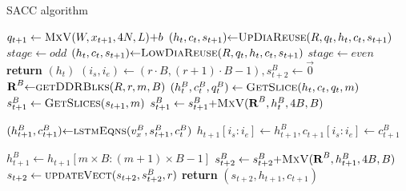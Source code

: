 \begin{algorithm}[H]
	\caption{SACC algorithm}
   \label{Algo:SACCAlgo}
	\begin{algorithmic}[1]
		 \label{alg:CompLSTMCell}
\State $q_{t+1}\gets \Call{MxV}{W,x_{t+1},4N,L}{+}b$\label{alg:Wx+b}
\State $(h_{t},c_{t},s_{t+1}){\gets}\Call{UpDiaReuse}{R,q_t,h_t,c_t,s_{t+1}}$\label{alg:callUpDiaReuse}
\State $stage\gets odd$
\Else
\State $(h_{t},c_{t},s_{t+1}){\gets}\Call{LowDiaReuse}{R,q_t,h_t,c_t,s_{t+1}}$\label{alg:callLowDiaReuse}
\State $stage\gets even$
\EndIf
\State \textbf{return} $(h_{t})$
\EndProcedure	
%
		 \label{alg:LowDiagReuse}
		 \label{alg:LowDiag_outFor} 
		\State $(i_s,i_e) \gets (r{\cdot}B,(r{+}1){\cdot}B{-}1), s^B_{t+2} \gets \vec{0}$
		 \label{alg:LowDiag_inFor}
		\State $\textbf{R}^B {\gets}\Call{getDDRBlks}{R,r,m,B}$	     \label{alg:LowDiag_GetDDRBlks}   		     
       \State $(h^B_t,c^B_t,q^B_t)\gets \Call{GetSlice}{h_t,c_t,q_t,m}$ \label{alg:LowDiag_GetSlice}
       \State $s^B_{t+1}\gets \Call{GetSlices}{s_{t+1},m}$ \label{alg:LowDiag_GetSlices}
		\State $s^B_{t+1}\gets s^B_{t+1}{+}\Call{MxV}{\textbf{R}^B,h^B_t,4B,B}$ \label{alg:LowDiag_ReuseR1}  
		
		 \label{alg:LowDiag_if}
		\State$(h^B_{t+1},c^B_{t+1}){\gets}\Call{lstmEqns}{v^B_x,s^B_{t+1},c^B_t}$ \label{alg:LowDiag_LstmEq} 
		\State $h_{t+1}\left [i_s\colon i_e\right ]\gets h^B_{t+1}, c_{t+1}\left [i_s\colon i_e\right ]\gets c^B_{t+1}$ \label{alg:LowDiag_UpdateH} 
		\EndIf

		\State $h^B_{t+1}\gets h_{t+1}\left [m{\times}B\colon (m{+}1){\times}B{-}1\right ]$
		\State $s^B_{t+2}\gets s^B_{t+2}{+}\Call{MxV}{\textbf{R}^B,h_{t+1}^B, 4B,B}$  \label{alg:LowDiag_ReuseR2}  
		\EndFor
		\State $s_{t+2}\gets \Call{updateVect}{s_{t+2},s_{t+2}^B,r}$
		\EndFor
		\State \textbf{return} $(s_{t+2},h_{t+1},c_{t+1})$	
		\EndProcedure
		

\end{algorithmic}
\end{algorithm}

